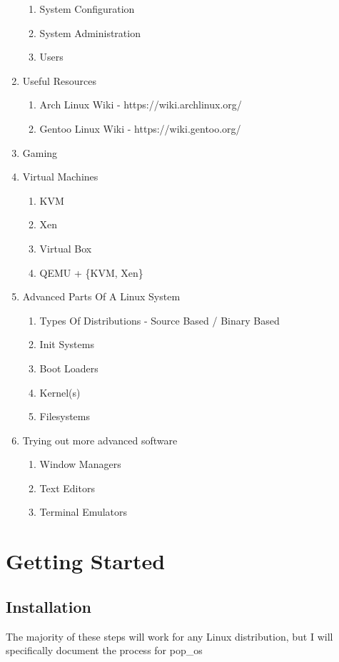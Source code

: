 \documentclass {report}
\begin{document}
\begin{enumerate}
\begin{enumerate}
      \item System Configuration
      \item System Administration
      \item Users
    \end{enumerate}
  \item Useful Resources
    \begin{enumerate}
      \item Arch Linux Wiki - https://wiki.archlinux.org/
      \item Gentoo Linux Wiki - https://wiki.gentoo.org/
    \end{enumerate}
  \item Gaming
  \item Virtual Machines
    \begin{enumerate}
      \item KVM
      \item Xen
      \item Virtual Box
      \item QEMU + \{KVM, Xen\}
    \end{enumerate}
  \item Advanced Parts Of A Linux System
    \begin{enumerate}
      \item Types Of Distributions - Source Based / Binary Based
      \item Init Systems
      \item Boot Loaders
      \item Kernel(s)
      \item Filesystems
    \end{enumerate}
  \item Trying out more advanced software
    \begin{enumerate}
      \item Window Managers
      \item Text Editors
      \item Terminal Emulators
    \end{enumerate}
\end{enumerate}

\chapter{Getting Started}
\section{Installation}
The majority of these steps will work for any Linux distribution, but I will specifically document the process for pop\_os
\end{document}
